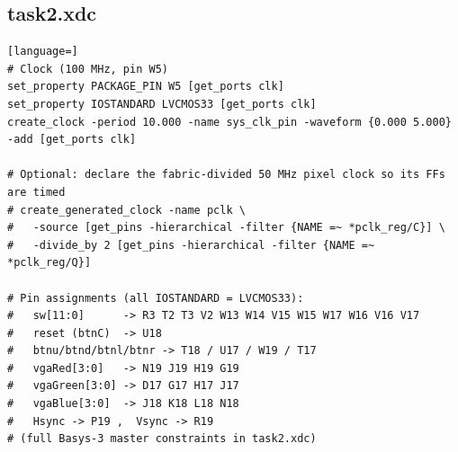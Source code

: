 \documentclass[11pt,a4paper]{article}
\begin{document}
\newpage
\subsection*{task2.xdc}
\begin{lstlisting}[language=]
# Clock (100 MHz, pin W5)
set_property PACKAGE_PIN W5 [get_ports clk]
set_property IOSTANDARD LVCMOS33 [get_ports clk]
create_clock -period 10.000 -name sys_clk_pin -waveform {0.000 5.000} -add [get_ports clk]

# Optional: declare the fabric-divided 50 MHz pixel clock so its FFs are timed
# create_generated_clock -name pclk \
#   -source [get_pins -hierarchical -filter {NAME =~ *pclk_reg/C}] \
#   -divide_by 2 [get_pins -hierarchical -filter {NAME =~ *pclk_reg/Q}]

# Pin assignments (all IOSTANDARD = LVCMOS33):
#   sw[11:0]      -> R3 T2 T3 V2 W13 W14 V15 W15 W17 W16 V16 V17
#   reset (btnC)  -> U18
#   btnu/btnd/btnl/btnr -> T18 / U17 / W19 / T17
#   vgaRed[3:0]   -> N19 J19 H19 G19
#   vgaGreen[3:0] -> D17 G17 H17 J17
#   vgaBlue[3:0]  -> J18 K18 L18 N18
#   Hsync -> P19 ,  Vsync -> R19
# (full Basys-3 master constraints in task2.xdc)
\end{lstlisting}
\end{document}
